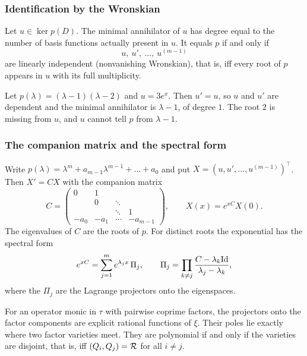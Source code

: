 \subsubsection{Identification by the Wronskian}

\begin{proposition}\label{prop:ode-ident}
Let $u\in\ker p(D)$. The minimal annihilator of $u$ has degree equal to the number of basis functions actually present in $u$. It equals $p$ if and only if
\[
u,\ u',\ \dots,\ u^{(m-1)}
\]
are linearly independent (nonvanishing Wronskian), that is, iff every root of $p$ appears in $u$ with its full multiplicity.

\end{proposition}

\begin{example}
Let $p(\lambda)=(\lambda-1)(\lambda-2)$ and $u=3e^{x}$. Then $u'=u$, so $u$ and $u'$ are dependent and the minimal annihilator is $\lambda-1$, of degree $1$. The root $2$ is missing from $u$, and $u$ cannot tell $p$ from $\lambda-1$.
\end{example}

\subsubsection{The companion matrix and the spectral form}

Write $p(\lambda)=\lambda^m+a_{m-1}\lambda^{m-1}+\dots+a_0$ and put $X=(u,u',\dots,u^{(m-1)})^{\top}$. Then $X'=CX$ with the companion matrix
\[
C=\begin{pmatrix}0&1&&\\&0&\ddots&\\&&\ddots&1\\-a_0&-a_1&\cdots&-a_{m-1}\end{pmatrix},
\qquad X(x)=e^{xC}X(0).
\]
The eigenvalues of $C$ are the roots of $p$. For distinct roots the exponential has the spectral form
\begin{equation}\label{f:eq:spectral}
e^{xC}=\sum_{j=1}^me^{\lambda_jx}\,\Pi_j,\qquad
\Pi_j=\prod_{k\ne j}\frac{C-\lambda_k\mathrm{Id}}{\lambda_j-\lambda_k},
\end{equation}
where the $\Pi_j$ are the Lagrange projectors onto the eigenspaces.

\begin{proposition}\label{prop:proj}
For an operator monic in $\tau$ with pairwise coprime factors, the projectors onto the factor components are explicit rational functions of $\xi$. Their poles lie exactly where two factor varieties meet. They are polynomial if and only if the varieties are disjoint, that is, iff $(Q_i,Q_j)=\mathcal{R}$ for all $i\ne j$.

\end{proposition}

